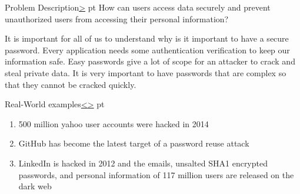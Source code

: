 \documentclass[12pt]{article}
\newenvironment{instructionblock}{\Large\bgroup}{\egroup}
\begin{document}
\pagebreak
\tableofcontents


\pagebreak
{}
\setcounter{section}{1}

\pagebreak
\begin{slide}{Problem Description}{\hyperref[slide 2]{\textgreater}}
 pt
\begin{instructionblock}
How can users access data securely and prevent unauthorized users from accessing their personal information? 
\end{instructionblock}
\end{slide}

\vfill

It is important for all of us to understand why is it important to have a secure password. Every application needs some authentication verification to keep our information safe. Easy passwords give a lot of scope for an attacker to crack and steal private data. It is very important to have passwords that are complex so that they cannot be cracked quickly. 



\pagebreak
\begin{slide}{Real-World examples}{\hyperref[slide 1]{\textless}\hyperref[slide 3]{\textgreater}}
 pt
\begin{instructionblock}
\begin{enumerate}
	\item 500 million yahoo user accounts were hacked in 2014 \cite{yahoo}
	\item GitHub has become the latest target of a password reuse attack\cite{github}
	\item LinkedIn is hacked in 2012 and the emails, unsalted SHA1 encrypted passwords, and personal information of 117 million users are released on the dark web \cite{linkedin}
	
\end{enumerate}
\end{instructionblock}
\end{slide}
\vfill
\end{document}
